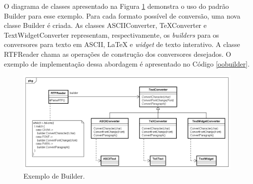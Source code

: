 O diagrama de classes apresentado na Figura 
\ref{builder_exemplo} demonstra o uso do padrão 
Builder para esse exemplo. Para cada formato possível 
de conversão, uma nova classe Builder é criada. 
As classes ASCIIConverter, TeXConverter e 
TextWidgetConverter representam, respectivamente, 
os \textit{builders} para os conversores para texto 
em ASCII, LaTeX e \textit{widget} de texto interativo. 
A classe RTFReader chama as operações de construção 
dos conversores desejados. O exemplo de 
implementação dessa abordagem é apresentado no 
Código \ref{oobuilder}.

\begin{figure}[htb]
	\caption{\label{builder_exemplo}Exemplo de Builder.}
	\begin{center}
	    \includegraphics[scale=0.5]{5_padroes-contexto-funcional/5.1_criacionais/5.1.3_builder/builder_exemplo.png}
	\end{center}
\end{figure}

